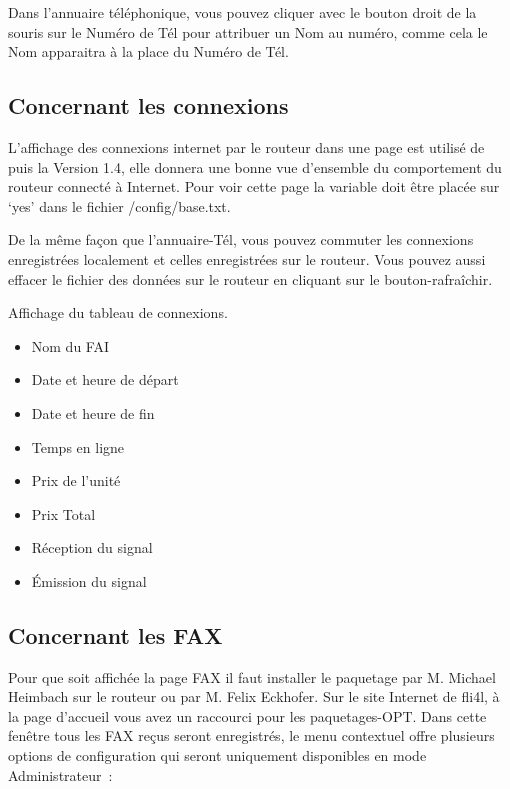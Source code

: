   Dans l'annuaire téléphonique, vous pouvez cliquer avec le bouton droit
  de la souris sur le Numéro de Tél pour attribuer un Nom au numéro, comme
  cela le Nom apparaitra à la place du Numéro de Tél.

  \subsection{Concernant les connexions}

  L'affichage des connexions internet par le routeur dans une page est utilisé
  de puis la Version 1.4, elle donnera une bonne vue d'ensemble du comportement
  du routeur connecté à Internet. Pour voir cette page la variable 
  doit être placée sur `yes' dans le fichier /config/base.txt.

  De la même façon que l'annuaire-Tél, vous pouvez commuter les connexions
  enregistrées localement et celles enregistrées sur le routeur. Vous pouvez
  aussi effacer le fichier des données sur le routeur en cliquant sur
  le bouton-rafraîchir.

  Affichage du tableau de connexions.

  \begin{itemize}
  \item Nom du FAI
  \item Date et heure de départ
  \item Date et heure de fin
  \item Temps en ligne
  \item Prix de l'unité
  \item Prix Total
  \item Réception du signal
  \item Émission du signal
  \end{itemize}

  \subsection{Concernant les FAX}

  Pour que soit affichée la page FAX il faut installer le paquetage
   par M. Michael Heimbach sur le routeur ou
   par M. Felix Eckhofer. Sur le site Internet de
  fli4l, à la page d'accueil vous avez un raccourci pour les
  paquetages-OPT. Dans cette fenêtre tous les FAX reçus seront enregistrés,
  le menu contextuel offre plusieurs options de configuration qui seront
  uniquement disponibles en mode Administrateur~:

